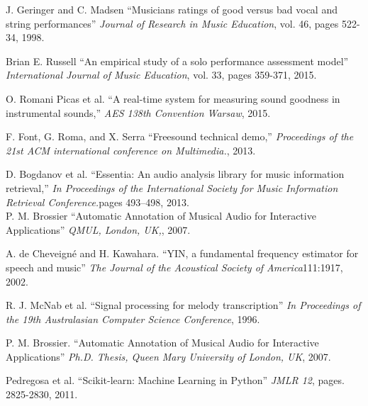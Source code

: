 \documentclass{article}
\begin{document}
\begin{thebibliography}{citations}
%
J. Geringer and C. Madsen
``Musicians ratings of good versus bad vocal and string performances''
{\it Journal of Research in Music Education}, vol. 46, pages 522-34, 1998.

Brian E. Russell
``An empirical study of a solo performance assessment model''
{\it  International Journal of Music Education}, vol. 33, pages 359-371, 2015.

O. Romani Picas et al.
``A real-time system for measuring sound goodness in instrumental sounds,''
{\it AES 138th Convention Warsaw}, 2015.

 F. Font, G. Roma, and X. Serra
``Freesound technical demo,''
{\it Proceedings of the 21st ACM international conference on Multimedia.}, 2013.

 D. Bogdanov et al.
``Essentia: An audio analysis library for music information retrieval,''
{\it  In Proceedings of the International Society for Music Information Retrieval Conference.}pages 493–498, 2013.
\\
 P. M. Brossier
``Automatic Annotation of Musical Audio for Interactive Applications''
{\it QMUL, London, UK,}, 2007.

 A. de Cheveigné and H. Kawahara.
``YIN, a fundamental frequency estimator for speech and music''
{\it The Journal of the Acoustical Society of America}111:1917, 2002.

 R. J. McNab et al.
``Signal processing for melody transcription''
{\it In Proceedings of the 19th Australasian Computer Science Conference}, 1996.

P. M. Brossier.
``Automatic Annotation of Musical Audio for Interactive Applications''
{\it Ph.D. Thesis, Queen Mary University of London, UK}, 2007.

Pedregosa et al.
``Scikit-learn: Machine Learning in Python''
{\it JMLR 12}, pages. 2825-2830, 2011.


\end{thebibliography}
\end{document}
